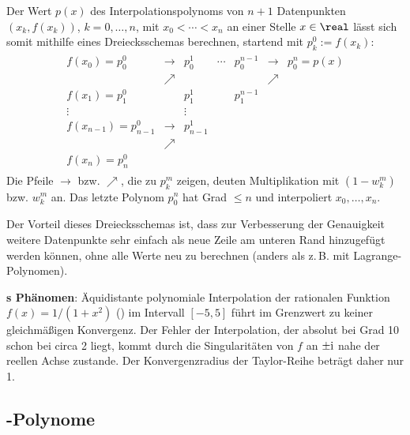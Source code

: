 Der Wert $p(x)$ des Interpolationspolynoms
von $n + 1$ Datenpunkten $(x_k, f(x_k))$, $k = 0, \dotsc, n$, mit $x_0 < \dotsb < x_n$
an einer Stelle $x \in \real$ lässt sich somit mithilfe eines Dreiecksschemas berechnen,
startend mit $p_k^0 := f(x_k)$:
\begin{align*}
    \begin{array}{ccccccc}
        f(x_0) = p_0^0 & \rightarrow & p_0^1 & \cdots & p_0^{n-1} & \rightarrow & p_0^n = p(x)\\
        & \nearrow & & & & \nearrow\\
        f(x_1) = p_1^0 & & p_1^1 & & p_1^{n-1}\\
        \vdots & & \vdots &\\
        f(x_{n-1}) = p_{n-1}^0 & \rightarrow & p_{n-1}^1\\
        & \nearrow\\
        f(x_n) = p_n^0
    \end{array}
\end{align*}
Die Pfeile $\rightarrow$ bzw. $\nearrow$, die zu $p_k^m$ zeigen,
deuten Multiplikation mit $(1 - w_k^m)$ bzw. $w_k^m$ an.
Das letzte Polynom $p_0^n$ hat Grad $\le n$ und interpoliert $x_0, \dotsc, x_n$.

Der Vorteil dieses Dreiecksschemas ist, dass zur Verbesserung der Genauigkeit
weitere Datenpunkte sehr einfach als neue Zeile am unteren Rand hinzugefügt
werden können, ohne alle Werte neu zu berechnen
(anders als z.\,B. mit Lagrange-Polynomen).

\linie

\textbf{s Phänomen}:
Äquidistante polynomiale Interpolation der rationalen Funktion $f(x) = 1/(1 + x^2)$
() im Intervall $[-5, 5]$ führt
im Grenzwert zu keiner gleichmäßigen Konvergenz.
Der Fehler der Interpolation, der absolut bei Grad 10 schon bei circa 2 liegt, kommt durch die
Singularitäten von $f$ an $\pm \mathrm{i}$ nahe der reellen Achse zustande.
Der Konvergenzradius der Taylor-Reihe beträgt daher nur 1.

\subsection{%
    -Polynome%
}

